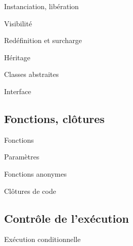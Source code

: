 \documentclass{beamer}
\begin{document}
\begin{frame}{Instanciation, libération}

\end{frame}

\begin{frame}{Visibilité}

\end{frame}

\begin{frame}{Redéfinition et surcharge}

\end{frame}

\begin{frame}{Héritage}

\end{frame}

\begin{frame}{Classes abstraites}

\end{frame}

\begin{frame}{Interface}

\end{frame}

\subsection{Fonctions, clôtures}

\begin{frame}{Fonctions} %

\end{frame}

\begin{frame}{Paramètres}

\end{frame}

\begin{frame}{Fonctions anonymes} %

\end{frame}

\begin{frame}{Clôtures de code} %

\end{frame}

\subsection{Contrôle de l’exécution}

\begin{frame}{Exécution conditionnelle} %

\end{frame}
\end{document}
